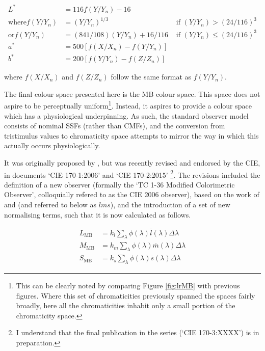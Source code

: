 \begin{subequations}
\begin{align}
L^{*} &= 116 f(Y/Y_{n})-16 \\
\textrm{where} f(Y/Y_{n}) &= (Y/Y_{n})^{1/3} &\textrm{ if } (Y/Y_{n}) > (24/116)^{3} \\
\textrm{or} f(Y/Y_{n}) &= (841/108)(Y/Y_{n})+16/116 &\textrm{ if } (Y/Y_{n}) \leq (24/116)^{3} \\
a^{*} &= 500[f(X/X_{n}) - f(Y/Y_{n})] \\ 
b^{*} &= 200[f(Y/Y_{n}) - f(Z/Z_{n})] 
\end{align}
\end{subequations}

where $f(X/X_{n})$ and $f(Z/Z_{n})$ follow the same format as $f(Y/Y_{n})$.

The final colour space presented here is the \acrfull{MB} colour space. This space does not aspire to be perceptually uniform\footnote{This can be clearly noted by comparing Figure \ref{fig:lrMB} with previous figures. Where this set of chromaticities previously spanned the spaces fairly broadly, here all the chromaticities inhabit only a small portion of the chromaticity space.}. Instead, it aspires to provide a colour space which has a physiological underpinning. As such, the standard observer model consists of nominal \glspl{SSF} (rather than \glspl{CMF}), and the conversion from tristimulus values to chromaticity space attempts to mirror the way in which this actually occurs physiologically.

It was originally proposed by \citet{macleod_chromaticity_1979}, but was recently revised and endorsed by the \gls{CIE}, in documents `CIE 170-1:2006' \citep{cie_cie_2006} and `CIE 170-2:2015' \citep{cie_cie_2015}\footnote{I understand that the final publication in the series (`CIE 170-3:XXXX') is in preparation.}. The revisions included the definition of a new observer (formally the `TC 1-36 Modified Colorimetric Observer', colloquially refered to as the \gls{CIE} 2006 observer), based on the work of \citet{stockman_spectral_1999} and \citet{stockman_spectral_2000} (and referred to below as $\overline{lms}$), and the introduction of a set of new normalising terms, such that it is now calculated as follows.

\begin{subequations}
\begin{align}
L_{\text{MB}}&=k_{l} \sum_{\lambda} \phi(\lambda) \overline{l}(\lambda) \Delta \lambda \\ 
M_{\text{MB}}&=k_{m} \sum_{\lambda} \phi(\lambda) \overline{m}(\lambda) \Delta \lambda \\ 
S_{\text{MB}}&=k_{s} \sum_{\lambda} \phi(\lambda) \overline{s}(\lambda) \Delta \lambda
\end{align}
\label{eq:MBTristim}
\end{subequations}

